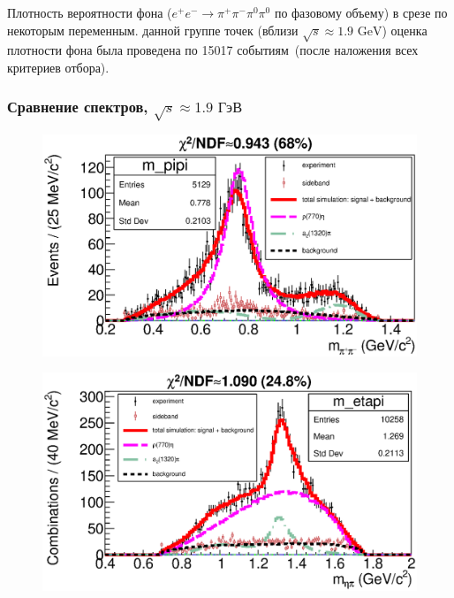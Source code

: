 \documentclass{beamer}
\begin{document}
\begin{frame}
\begin{center}
\begin{minipage}[t]{0.4\linewidth}
\begin{figure}
      \end{figure}
    \end{minipage}
  \end{center}
  \scriptsize
  Плотность вероятности фона ($e^+e^-\rightarrow\pi^+\pi^-\pi^0\pi^0$ по фазовому объему) в срезе по
  некоторым переменным.  данной группе точек (вблизи $\sqrt{s}\approx 1.9\text{ GeV}$)
  оценка плотности фона была проведена по 15017 событиям~(после наложения всех
  критериев отбора).
\end{frame}


\begin{frame}
  \frametitle{Сравнение спектров, $\sqrt{s}\approx{1.9}\text{ ГэВ}$}
  \begin{minipage}[t]{0.48\linewidth}
    \begin{figure}
      \includegraphics[width=\linewidth]{figures/m_pipi_g950.eps}
    \end{figure}
  \end{minipage}
  \begin{minipage}[t]{0.48\linewidth}
    \begin{figure}
      \includegraphics[width=\linewidth]{figures/m_etapi_g950.eps}

\end{figure}
\end{minipage}
\end{frame}
\end{document}
